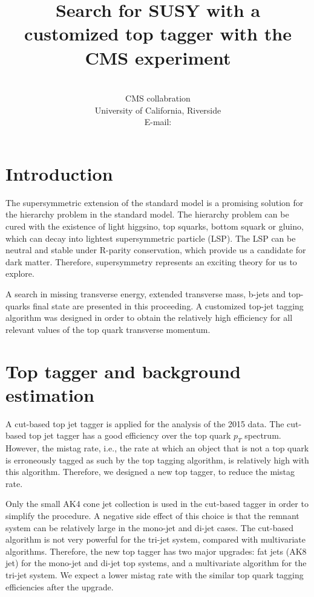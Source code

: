 \documentclass{PoS}
\title{Search for SUSY with a customized top tagger with the CMS experiment}
\author
{
  \speaker{Hua Wei}\\
  CMS collabration\\
  University of California, Riverside\\
  E-mail: \email{hua.wei@cern.ch}
}
\begin{document}
\section{Introduction}

The supersymmetric extension of the standard model is a promising solution for the hierarchy problem in the standard model. The hierarchy problem can be cured with the existence of light higgsino, top squarks, bottom squark or gluino, which can decay into lightest supersymmetric particle (LSP). The LSP can be neutral and stable under R-parity conservation, which provide us a candidate for dark matter. Therefore, supersymmetry represents an exciting theory for us to explore.

A search in missing transverse energy, extended transverse mass, b-jets and top-quarks final state are presented in this proceeding. A customized top-jet tagging algorithm was designed in order to obtain the relatively high efficiency for all relevant values of the top quark transverse momentum.

\section{Top tagger and background estimation}

A cut-based top jet tagger is applied for the analysis of the 2015 data\cite{PhysRevD.96.012004}. The cut-based top jet tagger has a good efficiency over the top quark $p_{T}$ spectrum. However, the mistag rate, i.e., the rate at which an object that is not a top quark is erroneously tagged as such by the top tagging algorithm, is relatively high with this algorithm. Therefore, we designed a new top tagger, to reduce the mistag rate.

Only the small AK4 cone jet collection is used in the cut-based tagger in order to simplify the procedure. A negative side effect of this choice is that the remnant system can be relatively large in the mono-jet and di-jet cases. The cut-based algorithm is not very powerful for the tri-jet system, compared with multivariate algorithms. Therefore, the new top tagger has two major upgrades: fat jets (AK8 jet) for the mono-jet and di-jet top systems, and a multivariate algorithm for the tri-jet system. We expect a lower mistag rate with the similar top quark tagging efficiencies after the upgrade.
\end{document}
